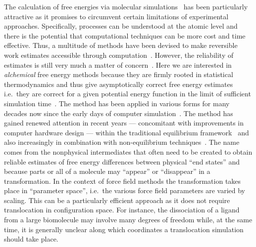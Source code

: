 \documentclass[journal=jctcce,manuscript=article]{achemso}
\begin{document}
The calculation of free energies via molecular 
simulations~\cite{hansen_practical_2014, doi:10.1021/jp102971x,
  Gallicchio201127, doi:10.1080/08927022.2015.1132317,
  doi:10.1146/annurev.matsci.32.111901.153708} has been particularly
attractive as it promises to circumvent certain limitations of experimental
approaches. Specifically, processes can be understood at the atomic level and there is the potential that computational techniques can be 
more cost and time effective.  Thus, a multitude of methods have been devised
 to make reversible work estimates accessible through 
computation~\cite{hansen_practical_2014,
  doi:10.1021/jp102971x, Gallicchio201127,
  doi:10.1080/08927022.2015.1132317,
  doi:10.1146/annurev.matsci.32.111901.153708}.  However, the
reliability of estimates is still very much a matter of
concern~\cite{doi:10.1021/jp102971x, doi:10.1021/acs.jctc.5b00179}.
Here we are interested in \emph{alchemical} 
free energy methods because they are firmly rooted in statistical 
thermodynamics and thus give asymptotically correct free energy estimates i.e.\
they are correct for a given potential energy function in the limit of 
sufficient simulation time~\cite{Beveridge-citeulike:3789890,
  straatsma:92, doi:10.1021/cr00023a004, hansen_practical_2014}.
The method has been applied in various forms for many decades now since
the early days of computer simulation~\cite{doi:10.1063/1.1671118,
  bennett_efficient_1976, doi:10.1063/1.432264, FS9821700055,
  Tembe1984281, doi:10.1063/1.449208}.  The method has gained renewed
attention in recent years --- concomitant with improvements in
computer hardware design --- within the traditional equilibrium
framework~\cite{GILSON19971047, doi:10.1021/jp0217839,
  deng_computations_2009} and also increasingly in combination with
non-equilibrium techniques~\cite{ytreberg_comparison_2006, JCC:JCC23804,
  doi:10.1021/ct500964e}.  The name comes from the nonphysical
intermediates that often need to be created to obtain reliable estimates of free energy differences between physical ``end states'' and because parts or all of a molecule may ``appear'' or ``disappear'' in a transformation.  In the context of force field
methods the transformation takes place in ``parameter space'', i.e.\ the
various force field parameters are varied by scaling.  This can be a particularly efficient approach as it does not require translocation in configuration space.
For instance, the dissociation of a ligand from
a large biomolecule may involve many degrees of freedom while, at the
same time, it is generally unclear along which coordinates a
translocation simulation should take place.
\end{document}
